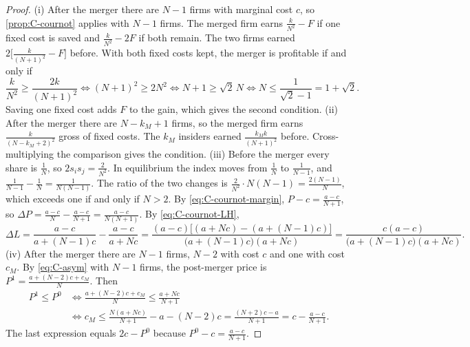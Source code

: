 \begin{proof}
(i) After the merger there are $N - 1$ firms with marginal cost $c$, so \cref{prop:C-cournot} applies with
$N - 1$ firms. The merged firm earns $\frac{k}{N^2} - F$ if one fixed cost is saved and $\frac{k}{N^2} - 2F$
if both remain. The two firms earned $2\big[\frac{k}{(N + 1)^2} - F\big]$ before. With both fixed costs kept,
the merger is profitable if and only if
\begin{equation*}
\frac{k}{N^2} \ge \frac{2k}{(N + 1)^2} \iff (N + 1)^2 \ge 2N^2 \iff N + 1 \ge \sqrt 2\,N
\iff N \le \frac{1}{\sqrt 2 - 1} = 1 + \sqrt 2 .
\end{equation*}
Saving one fixed cost adds $F$ to the gain, which gives the second condition.
(ii) After the merger there are $N - k_M + 1$ firms, so the merged firm earns $\frac{k}{(N - k_M + 2)^2}$ gross
of fixed costs. The $k_M$ insiders earned $\frac{k_Mk}{(N + 1)^2}$ before. Cross-multiplying the comparison
gives the condition.
(iii) Before the merger every share is $\frac{1}{N}$, so $2s_is_j = \frac{2}{N^2}$. In equilibrium the index
moves from $\frac{1}{N}$ to $\frac{1}{N - 1}$, and $\frac{1}{N - 1} - \frac{1}{N} = \frac{1}{N(N - 1)}$. The
ratio of the two changes is $\frac{2}{N^2}\cdot N(N - 1) = \frac{2(N - 1)}{N}$, which exceeds one if and only if
$N > 2$. By \eqref{eq:C-cournot-margin}, $P - c = \frac{a - c}{N + 1}$, so
$\Delta P = \frac{a - c}{N} - \frac{a - c}{N + 1} = \frac{a - c}{N(N + 1)}$. By \eqref{eq:C-cournot-LH},
\begin{equation*}
\Delta L = \frac{a - c}{a + (N - 1)c} - \frac{a - c}{a + Nc}
= \frac{(a - c)\big[(a + Nc) - (a + (N - 1)c)\big]}{\big(a + (N - 1)c\big)(a + Nc)}
= \frac{c(a - c)}{\big(a + (N - 1)c\big)(a + Nc)} .
\end{equation*}
(iv) After the merger there are $N - 1$ firms, $N - 2$ with cost $c$ and one with cost $c_M$. By
\eqref{eq:C-asym} with $N - 1$ firms, the post-merger price is $P^1 = \frac{a + (N - 2)c + c_M}{N}$. Then
\begin{align*}
P^1 \le P^0 &\iff \frac{a + (N - 2)c + c_M}{N} \le \frac{a + Nc}{N + 1}\\
&\iff c_M \le \frac{N(a + Nc)}{N + 1} - a - (N - 2)c
= \frac{(N + 2)c - a}{N + 1} = c - \frac{a - c}{N + 1} .
\end{align*}
The last expression equals $2c - P^0$ because $P^0 - c = \frac{a - c}{N + 1}$.
\end{proof}

